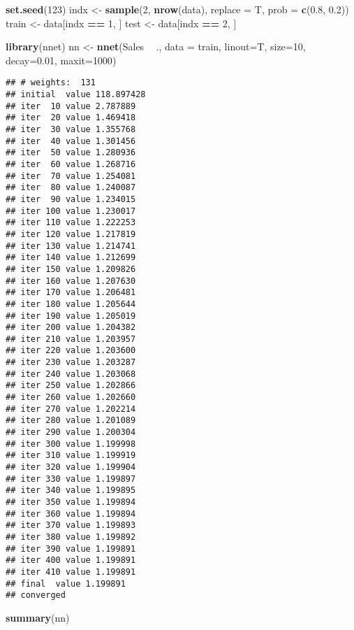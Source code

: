 \documentclass[
]{article}
\newenvironment{Shaded}{\begin{snugshade}}{\end{snugshade}}
\newcommand{\DataTypeTok}[1]{\textcolor[rgb]{0.13,0.29,0.53}{#1}}
\newcommand{\DecValTok}[1]{\textcolor[rgb]{0.00,0.00,0.81}{#1}}
\newcommand{\FloatTok}[1]{\textcolor[rgb]{0.00,0.00,0.81}{#1}}
\newcommand{\KeywordTok}[1]{\textcolor[rgb]{0.13,0.29,0.53}{\textbf{#1}}}
\newcommand{\NormalTok}[1]{#1}
\newcommand{\OperatorTok}[1]{\textcolor[rgb]{0.81,0.36,0.00}{\textbf{#1}}}
\newcommand{\StringTok}[1]{\textcolor[rgb]{0.31,0.60,0.02}{#1}}
\begin{document}
\begin{Shaded}
\begin{Highlighting}[]
\KeywordTok{set.seed}\NormalTok{(}\DecValTok{123}\NormalTok{)}
\NormalTok{indx <-}\StringTok{ }\KeywordTok{sample}\NormalTok{(}\DecValTok{2}\NormalTok{, }\KeywordTok{nrow}\NormalTok{(data), }\DataTypeTok{replace =}\NormalTok{ T, }\DataTypeTok{prob =} \KeywordTok{c}\NormalTok{(}\FloatTok{0.8}\NormalTok{, }\FloatTok{0.2}\NormalTok{))}
\NormalTok{train <-}\StringTok{ }\NormalTok{data[indx }\OperatorTok{==}\StringTok{ }\DecValTok{1}\NormalTok{, ]}
\NormalTok{test <-}\StringTok{ }\NormalTok{data[indx }\OperatorTok{==}\StringTok{ }\DecValTok{2}\NormalTok{, ]}

\KeywordTok{library}\NormalTok{(nnet)}
\NormalTok{nn  <-}\StringTok{ }\KeywordTok{nnet}\NormalTok{(Sales }\OperatorTok{~}\StringTok{ }\NormalTok{., }\DataTypeTok{data =}\NormalTok{ train, }\DataTypeTok{linout=}\NormalTok{T, }\DataTypeTok{size=}\DecValTok{10}\NormalTok{, }\DataTypeTok{decay=}\FloatTok{0.01}\NormalTok{, }\DataTypeTok{maxit=}\DecValTok{1000}\NormalTok{)}
\end{Highlighting}
\end{Shaded}

\begin{verbatim}
## # weights:  131
## initial  value 118.897428 
## iter  10 value 2.787889
## iter  20 value 1.469418
## iter  30 value 1.355768
## iter  40 value 1.301456
## iter  50 value 1.280936
## iter  60 value 1.268716
## iter  70 value 1.254081
## iter  80 value 1.240087
## iter  90 value 1.234015
## iter 100 value 1.230017
## iter 110 value 1.222253
## iter 120 value 1.217819
## iter 130 value 1.214741
## iter 140 value 1.212699
## iter 150 value 1.209826
## iter 160 value 1.207630
## iter 170 value 1.206481
## iter 180 value 1.205644
## iter 190 value 1.205019
## iter 200 value 1.204382
## iter 210 value 1.203957
## iter 220 value 1.203600
## iter 230 value 1.203287
## iter 240 value 1.203068
## iter 250 value 1.202866
## iter 260 value 1.202660
## iter 270 value 1.202214
## iter 280 value 1.201089
## iter 290 value 1.200304
## iter 300 value 1.199998
## iter 310 value 1.199919
## iter 320 value 1.199904
## iter 330 value 1.199897
## iter 340 value 1.199895
## iter 350 value 1.199894
## iter 360 value 1.199894
## iter 370 value 1.199893
## iter 380 value 1.199892
## iter 390 value 1.199891
## iter 400 value 1.199891
## iter 410 value 1.199891
## final  value 1.199891 
## converged
\end{verbatim}

\begin{Shaded}
\begin{Highlighting}[]
\KeywordTok{summary}\NormalTok{(nn) }
\end{Highlighting}
\end{Shaded}
\end{document}
